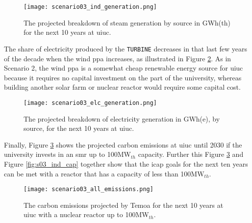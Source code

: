 \begin{figure}[ht!]
	\centering
	\texttt{[image: scenario03\_ind\_generation.png]}
	\caption{The projected breakdown of steam generation by source in GWh(th)
	for the next 10 years at \gls{uiuc}.}
	\label{fig:s03_ind_gen}
\end{figure}
The share of electricity produced by the \texttt{TURBINE} decreases in
that last few years of the decade when the wind \gls{ppa} increases, as
illustrated in Figure \ref{fig:s03_elc_gen}. As in Scenario 2, the wind
\gls{ppa} is a somewhat cheap renewable energy source for \gls{uiuc} because
it requires no capital investment on the part of the university, whereas
building another solar farm or nuclear reactor would require some capital cost.

\begin{figure}[ht!]
	\centering
	\texttt{[image: scenario03\_elc\_generation.png]}
	\caption{The projected breakdown of electricity generation in GWh(e), by
	source, for the next 10 years at \gls{uiuc}.}
	\label{fig:s03_elc_gen}
\end{figure}

Finally, Figure \ref{fig:s03_all_co2} shows the projected carbon emissions at
\gls{uiuc} until 2030 if the university invests in an \gls{smr} up to
100MW$_{th}$ capacity. Further this Figure \ref{fig:s03_all_co2} and Figure
\ref{fig:s03_ind_cap} together show that the \gls{icap} goals for the next ten
years can be met with a reactor that has a capacity of less than 100MW$_{th}$. 

\begin{figure}[ht!]
	\centering
	\texttt{[image: scenario03\_all\_emissions.png]}
	\caption{The carbon emissions projected by Temoa for the next 10 years at
	\gls{uiuc} with a nuclear reactor up to 100MW$_{th}$.}
	\label{fig:s03_all_co2}
\end{figure}
